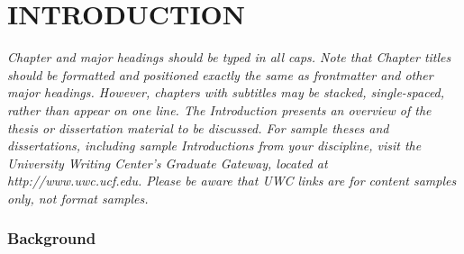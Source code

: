\documentclass{UCF_ETD}
\begin{document}
\listoftables

\mainmatter

\chapter{INTRODUCTION} 
\textit{Chapter and major headings should be typed in all caps.  Note that Chapter titles should be formatted and positioned exactly the same as frontmatter and other major headings. However, chapters with subtitles may be stacked, single-spaced, rather than appear on one line.
The Introduction presents an overview of the thesis or dissertation material to be discussed. For sample theses and dissertations, including sample Introductions from your discipline, visit the University Writing Center’s Graduate Gateway, located at http://www.uwc.ucf.edu. Please be aware that UWC links are for content samples only, not format samples.
}

\begin{comment}
Notes and Guidance for Introduction
1. Background - Introduce readers to current state of DL/AI in communications. Talk about Evolution and Significance of real world datasets like deepsnse or others...
2. Problem Statement - Define the problem clearly 
3. Objective - Give the main objective of the thesis such as Beam Prediction and domain adaptation, using multimodal.

Multimodal Networks 
1. Theory and Significance - Discuss the role and importance of MM Networks in DL, with respect to Communications.
2. Application to Deepsense 6G -- How do MM Networks apply to dataset? Discuss how to integrate multiple types of data can enhance learning process
3. Technical Challenges of MM -- Data Fusion, synchronization, etc

Data and Communication Challenges
1. Characteristics of DeepSense Dataset - Describe data in detail -- composition, time-based measurements, etc.
2. Data Processing and Management - Challenges i`n Handling real-world data...noise filter, data cleanring, and data integrity
3. Communication Specific Challenges -- Beamforming prediction, signal interference, etc.
\end{comment}

\subsection{Background}
\end{document}

